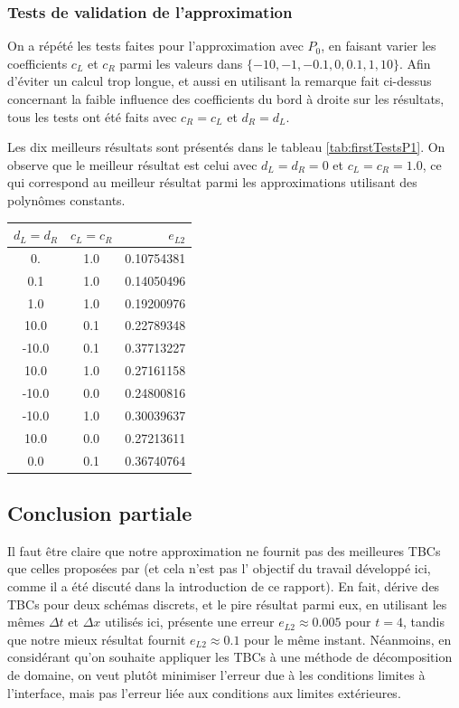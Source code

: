 \subsubsection{Tests de validation de l'approximation}

\indent On a répété les tests faites pour l'approximation avec $P_0$, en faisant varier les coefficients $c_L$ et $c_R$ parmi les valeurs dans $\{-10,-1,-0.1,0,0.1,1,10\}$. Afin d'éviter un calcul trop longue, et aussi en utilisant la remarque fait ci-dessus concernant la faible influence des coefficients du bord à droite sur les résultats, tous les tests ont été faits avec $c_R = c_L$ et $d_R = d_L$.

\indent Les dix meilleurs résultats sont présentés dans le tableau \ref{tab:firstTestsP1}. On observe que le meilleur résultat est celui avec $d_L = d_R = 0$ et $c_L = c_R = 1.0 $, ce qui correspond au meilleur résultat parmi les approximations utilisant des polynômes constants.


\begin{center}
\begin{tabular}{c|c|S[round-precision=4,table-number-alignment =  left]}
	  &  &  \\
	. & 1.0 & 0.10754381 \\
	0.1 & 1.0 & 0.14050496 \\
	1.0 & 1.0 & 0.19200976 \\
	10.0 & 0.1 & 0.22789348 \\
	-10.0 & 0.1 & 0.37713227 \\
	10.0 & 1.0 & 0.27161158 \\
	-10.0 &  0.0 & 0.24800816\\
	-10.0 & 1.0 & 0.30039637 \\
	10.0 & 0.0 & 0.27213611 \\
	0.0 & 0.1 & 0.36740764
\end{tabular}
\end{center}

\subsection{Conclusion partiale}

\indent Il faut être claire que notre approximation ne fournit pas des meilleures TBCs que celles proposées par \cite{besse2015} (et cela n'est pas l' objectif du travail développé ici, comme il a été discuté dans la introduction de ce rapport). En fait, \cite{besse2015} dérive des TBCs pour deux schémas discrets, et le pire résultat parmi eux, en utilisant les mêmes $\Delta t$ et $\Delta x$ utilisés ici, présente une erreur $e_{L2} \approx 0.005$ pour $t = 4$, tandis que notre mieux résultat fournit $e_{L2} \approx 0.1$ pour le même instant. Néanmoins, en considérant qu'on souhaite appliquer les TBCs à une méthode de décomposition de domaine, on veut plutôt minimiser l'erreur due à les conditions limites à l'interface, mais pas l'erreur liée aux conditions aux limites extérieures.

